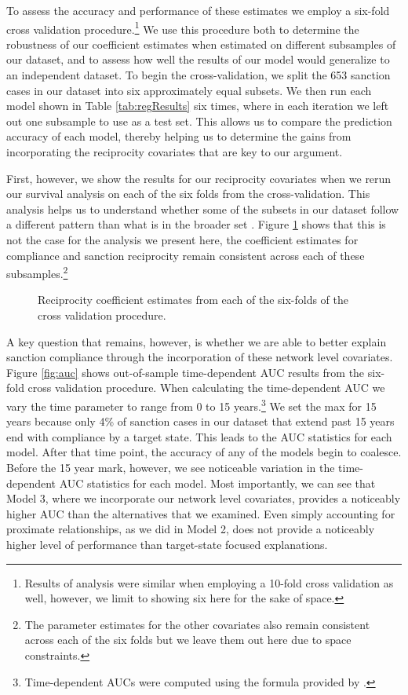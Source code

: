 To assess the accuracy and performance of these estimates we employ a six-fold cross validation procedure.\footnote{Results of analysis were similar when employing a 10-fold cross validation as well, however, we limit to showing six here for the sake of space.} We use this procedure both to determine the robustness of our coefficient estimates when estimated on different subsamples of our dataset, and to assess how well the results of our model would generalize to an independent dataset. To begin the cross-validation, we split the 653 sanction cases in our dataset into six approximately equal subsets. We then run each model shown in Table \ref{tab:regResults} six times, where in each iteration we left out one subsample to use as a test set. This allows us to compare the prediction accuracy of each model, thereby helping us to determine the gains from incorporating the reciprocity covariates that are key to our argument.

First, however, we show the results for our reciprocity covariates when we rerun our survival analysis on each of the six folds from the cross-validation. This analysis helps us to understand whether some of the subsets in our dataset follow a different pattern than what is in the broader set \citep{beck2008time}. Figure \ref{fig:crossval} shows that this is not the case for the analysis we present here, the coefficient estimates for compliance and sanction reciprocity remain consistent across each of these subsamples.\footnote{The parameter estimates for the other covariates also remain consistent across each of the six folds but we leave them out here due to space constraints.}

\newpage
\begin{figure}[ht]
	\centering
	\caption{Reciprocity coefficient estimates from each of the six-folds of the cross validation procedure.}
	\resizebox{1\textwidth}{!}{}
	\label{fig:crossval}
\end{figure}
\newpage

A key question that remains, however, is whether we are able to better explain sanction compliance through the incorporation of these network level covariates. Figure \ref{fig:auc} shows out-of-sample time-dependent AUC results from the six-fold cross validation procedure. When calculating the time-dependent AUC we vary the time parameter to range from 0 to 15 years.\footnote{Time-dependent AUCs were computed using the formula provided by \citet{chambless2006estimation}.} We set the max for 15 years because only 4\% of sanction cases in our dataset that extend past 15 years end with compliance by a target state. This leads to the AUC statistics for each model. After that time point, the accuracy of any of the models begin to coalesce. Before the 15 year mark, however, we see noticeable variation in the time-dependent AUC statistics for each model. Most importantly, we can see that Model 3, where we incorporate our network level covariates, provides a noticeably higher AUC than the alternatives that we examined. Even simply accounting for proximate relationships, as we did in Model 2, does not provide a noticeably higher level of performance than target-state focused explanations.

